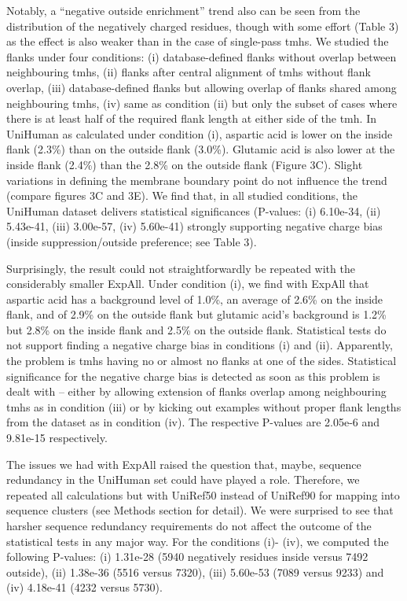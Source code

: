 Notably, a ``negative outside enrichment'' trend also can be seen from the distribution of the negatively charged residues, though with some effort (Table 3) as the effect is also weaker than in the case of single-pass \gls{tmh}s. We studied the flanks under four conditions: (i) database-defined flanks without overlap between neighbouring \gls{tmh}s, (ii) flanks after central alignment of \gls{tmh}s without flank overlap, (iii) database-defined flanks but allowing overlap of flanks shared among neighbouring \gls{tmh}s, (iv) same as condition (ii) but only the subset of cases where there is at least half of the required flank length at either side of the \gls{tmh}. In UniHuman as calculated under condition (i), aspartic acid is lower on the inside flank (2.3\%) than on the outside flank (3.0\%). Glutamic acid is also lower at the inside flank (2.4\%) than the 2.8\% on the outside flank (Figure 3C). Slight variations in defining the membrane boundary point do not influence the trend (compare figures 3C and 3E). We find that, in all studied conditions, the UniHuman dataset delivers statistical significances (P-values: (i) 6.10e-34, (ii) 5.43e-41, (iii) 3.00e-57, (iv) 5.60e-41) strongly supporting negative charge bias (inside suppression/outside preference; see Table 3).

Surprisingly, the result could not straightforwardly be repeated with the considerably smaller ExpAll. Under condition (i), we find with ExpAll that aspartic acid has a background level of 1.0\%, an average of 2.6\% on the inside flank, and of 2.9\% on the outside flank but glutamic acid’s background is 1.2\% but 2.8\% on the inside flank and 2.5\% on the outside flank. Statistical tests do not support finding a negative charge bias in conditions (i) and (ii). Apparently, the problem is \gls{tmh}s having no or almost no flanks at one of the sides. Statistical significance for the negative charge bias is detected as soon as this problem is dealt with – either by allowing extension of flanks overlap among neighbouring \gls{tmh}s as in condition (iii) or by kicking out examples without proper flank lengths from the dataset as in condition (iv). The respective P-values are 2.05e-6 and 9.81e-15 respectively.

The issues we had with ExpAll raised the question that, maybe, sequence redundancy in the UniHuman set could have played a role. Therefore, we repeated all calculations but with UniRef50 instead of UniRef90 for mapping into sequence clusters (see Methods section for detail). We were surprised to see that harsher sequence redundancy requirements do not affect the outcome of the statistical tests in any major way. For the conditions (i)- (iv), we computed the following P-values: (i) 1.31e-28 (5940 negatively residues inside versus 7492 outside), (ii) 1.38e-36 (5516 versus 7320), (iii) 5.60e-53 (7089 versus 9233) and (iv) 4.18e-41 (4232 versus 5730).

